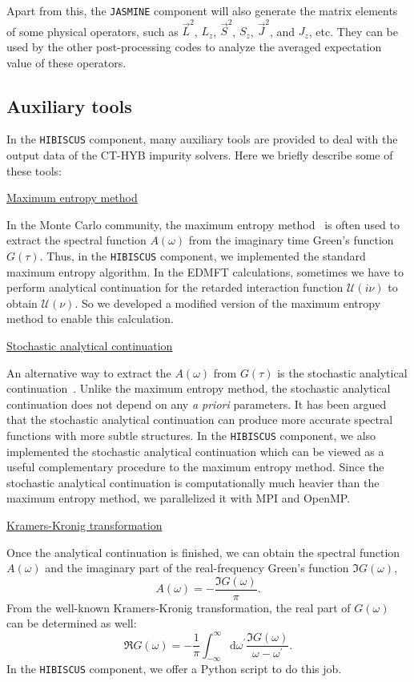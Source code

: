 Apart from this, the \texttt{JASMINE} component will also generate the matrix elements of some physical operators, such as $\vec{L}^2$, $L_{z}$, $\vec{S}^2$, $S_{z}$, $\vec{J}^2$, and $J_{z}$, etc. They can be used by the other post-processing codes to analyze the averaged expectation value of these operators.

\subsection{Auxiliary tools\label{subsec:hibiscus}}
In the \texttt{HIBISCUS} component, many auxiliary tools are provided to deal with the output data of the CT-HYB impurity solvers. Here we briefly describe some of these tools:

\underline{Maximum entropy method}

In the Monte Carlo community, the maximum entropy method~\cite{mem:1996} is often used to extract the spectral function $A(\omega)$ from the imaginary time Green's function $G(\tau)$. Thus, in the \texttt{HIBISCUS} component, we implemented the standard maximum entropy algorithm. In the EDMFT calculations, sometimes we have to perform analytical continuation for the retarded interaction function $\mathcal{U}(i\nu)$ to obtain $\mathcal{U}(\nu)$. So we developed a modified version of the maximum entropy method to enable this calculation.

\underline{Stochastic analytical continuation}

An alternative way to extract the $A(\omega)$ from $G(\tau)$ is the stochastic analytical continuation~\cite{arXiv:0403055}. Unlike the maximum entropy method, the stochastic analytical continuation does not depend on any \emph{a priori} parameters. It has been argued that the stochastic analytical continuation can produce more accurate spectral functions with more subtle structures. In the \texttt{HIBISCUS} component, we also implemented the stochastic analytical continuation which can be viewed as a useful complementary procedure to the maximum entropy method. Since the stochastic analytical continuation is computationally much heavier than the maximum entropy method, we parallelized it with MPI and OpenMP.

\underline{Kramers-Kronig transformation}

Once the analytical continuation is finished, we can obtain the spectral function $A(\omega)$ and the imaginary part of the real-frequency Green's function $\Im G(\omega)$,
\begin{equation}
A(\omega) = -\frac{\Im G(\omega)}{\pi}.
\end{equation}
From the well-known Kramers-Kronig transformation, the real part of $G(\omega)$ can be determined as well:
\begin{equation}
\Re G(\omega) = -\frac{1}{\pi} \int^{\infty}_{-\infty} \text{d}\omega^{\prime} \frac{\Im G(\omega)}{\omega - \omega^{\prime}}.
\end{equation}
In the \texttt{HIBISCUS} component, we offer a Python script to do this job.

